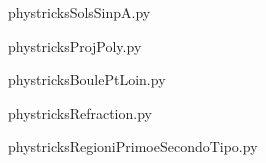     

    \clearpage
    


    \newcommand{\CaptionFigSolsSinpA}{<+Type your caption here+>}
    \begin{center}
        
    \end{center}
    phystricksSolsSinpA.py

    

    \clearpage
    


    \newcommand{\CaptionFigProjPoly}{<+Type your caption here+>}
    \begin{center}
        
    \end{center}
    phystricksProjPoly.py

    

    \clearpage
    


    \newcommand{\CaptionFigBoulePtLoin}{<+Type your caption here+>}
    \begin{center}
        
    \end{center}
    phystricksBoulePtLoin.py

    

    \clearpage
    


    \newcommand{\CaptionFigRefraction}{<+Type your caption here+>}
    \begin{center}
        
    \end{center}
    phystricksRefraction.py

    

    \clearpage
    


    \newcommand{\CaptionFigRegioniPrimoeSecondoTipo}{<+Type your caption here+>}
    \begin{center}
        
    \end{center}
    phystricksRegioniPrimoeSecondoTipo.py

    

    \clearpage
    


